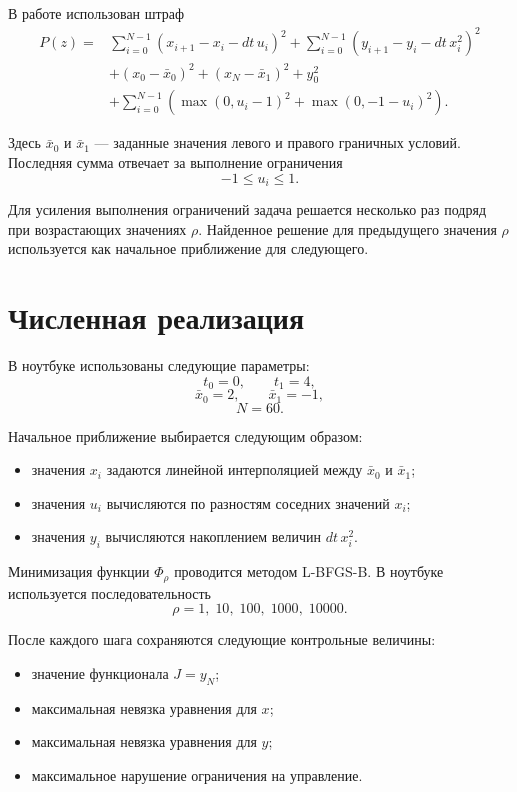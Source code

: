 \documentclass[12pt,a4paper]{article}
\begin{document}
В работе использован штраф
\[
\begin{aligned}
P(z) ={}&
    \sum_{i=0}^{N-1}
    \left(x_{i+1}-x_i-dt\,u_i\right)^2
    +
    \sum_{i=0}^{N-1}
    \left(y_{i+1}-y_i-dt\,x_i^2\right)^2
    \\
    &+
    (x_0-\bar x_0)^2
    +
    (x_N-\bar x_1)^2
    +
    y_0^2
    \\
    &+
    \sum_{i=0}^{N-1}
    \left(\max(0,u_i-1)^2+\max(0,-1-u_i)^2\right).
\end{aligned}
\]

Здесь \(\bar x_0\) и \(\bar x_1\) --- заданные значения левого и правого граничных условий. Последняя сумма отвечает за выполнение ограничения
\[
    -1 \le u_i \le 1.
\]

Для усиления выполнения ограничений задача решается несколько раз подряд при возрастающих значениях \(\rho\). Найденное решение для предыдущего значения \(\rho\) используется как начальное приближение для следующего.

\section{Численная реализация}

В ноутбуке использованы следующие параметры:
\[
    t_0 = 0, \qquad t_1 = 4,
\]
\[
    \bar x_0 = 2, \qquad \bar x_1 = -1,
\]
\[
    N = 60.
\]

Начальное приближение выбирается следующим образом:
\begin{itemize}
    \item значения \(x_i\) задаются линейной интерполяцией между \(\bar x_0\) и \(\bar x_1\);
    \item значения \(u_i\) вычисляются по разностям соседних значений \(x_i\);
    \item значения \(y_i\) вычисляются накоплением величин \(dt\,x_i^2\).
\end{itemize}

Минимизация функции \(\Phi_\rho\) проводится методом L-BFGS-B. В ноутбуке используется последовательность
\[
    \rho = 1,\;10,\;100,\;1000,\;10000.
\]

После каждого шага сохраняются следующие контрольные величины:
\begin{itemize}
    \item значение функционала \(J=y_N\);
    \item максимальная невязка уравнения для \(x\);
    \item максимальная невязка уравнения для \(y\);
    \item максимальное нарушение ограничения на управление.
\end{itemize}
\end{document}
